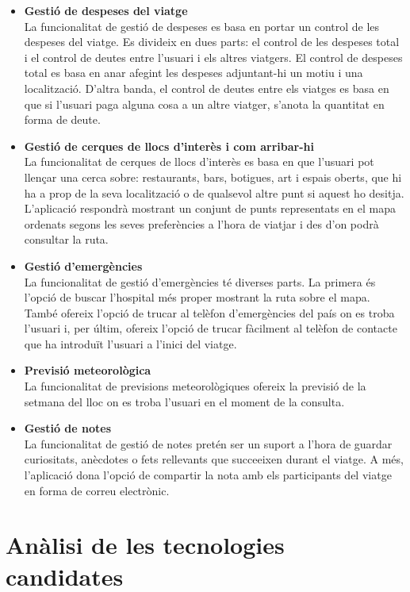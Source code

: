 \begin{itemize}

\item{}\textbf{Gestió de despeses del viatge}\\
La funcionalitat de gestió de despeses es basa en portar un control de les
despeses del viatge. Es divideix en dues parts: el control de les despeses
total i el control de deutes entre l'usuari i els altres viatgers. El control de despeses total es basa en anar afegint les despeses adjuntant-hi un motiu i una localització. D'altra banda, el control de deutes entre els viatges es basa en que si l'usuari paga alguna cosa a un altre viatger, s'anota la quantitat en forma de deute.
\item{}\textbf{Gestió de cerques de llocs d'interès i com arribar-hi}\\
La funcionalitat de cerques de llocs d'interès es basa en que l'usuari pot llençar una cerca sobre: restaurants, bars, botigues, art i espais oberts, que hi ha a prop de la seva localització o de qualsevol altre punt si aquest ho desitja. \\
L'aplicació respondrà mostrant
un conjunt de punts representats en el mapa ordenats segons les seves
preferències a l'hora de viatjar i des d'on podrà consultar la ruta.
\item{}\textbf{Gestió d'emergències}\\
La funcionalitat de gestió d'emergències té diverses parts. La primera és
l'opció de buscar l'hospital més proper mostrant la ruta sobre
el mapa. També ofereix l'opció de trucar al telèfon d'emergències del país on es troba l'usuari i, per últim, ofereix l'opció de trucar
fàcilment al telèfon de contacte que ha introduït l'usuari a l'inici del viatge.
\item{}\textbf{Previsió meteorològica}\\
La funcionalitat de previsions meteorològiques ofereix la previsió de la
setmana del lloc on es troba l'usuari en el moment de la consulta.
\item{}\textbf{Gestió de notes}\\
La funcionalitat de gestió de notes pretén ser un suport a l'hora de guardar curiositats, anècdotes o fets rellevants que succeeixen durant el viatge.
A més, l'aplicació dona l'opció de compartir la nota amb els participants del viatge en forma de correu electrònic.

\end{itemize}

\section{Anàlisi de les tecnologies candidates}

